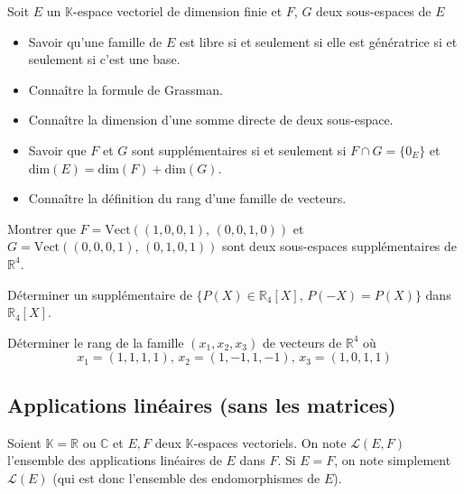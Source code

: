 \documentclass[a4paper,twoside,french,10pt]{VcCours}
\begin{document}
\begin{ptc}{}
	Soit $E$ un $\mathbb{K}$-espace vectoriel de dimension finie et $F$, $G$ deux sous-espaces de $E$
\begin{itemize}
\item Savoir qu'une famille de $E$ est libre si et seulement si elle est génératrice si et seulement si c'est une base.
\item Connaître la formule de Grassman.
\item Connaître la dimension d'une somme directe de deux sous-espace.
\item Savoir que $F$ et $G$ sont supplémentaires si et seulement si $F \cap G = \lbrace 0_E \rbrace$ et $\textrm{dim}(E)= \textrm{dim}(F) + \textrm{dim}(G)$.
\item Connaître la définition du rang d'une famille de vecteurs.
\end{itemize}
\end{ptc}

\medskip

\begin{Exercice}{}\end{Exercice} Montrer que $F=\textrm{Vect}((1,0,0,1), \, (0,0,1,0))$ et $G=\textrm{Vect}((0,0,0,1), \, (0,1,0,1))$ sont deux sous-espaces supplémentaires de $\mathbb{R}^4$.

\medskip

\begin{Exercice}{}\end{Exercice} Déterminer un supplémentaire de $\lbrace P(X) \in \mathbb{R}_4[X], \, P(-X)=P(X)\rbrace$ dans $\mathbb{R}_4[X]$.

\medskip

\begin{Exercice}{}\end{Exercice} Déterminer le rang de la famille $(x_1,x_2,x_3)$ de vecteurs de $\mathbb{R}^4$ où
$$ x_1 = (1,1,1,1), \, x_2 = (1, - 1,1, - 1), \, x_3 = (1,0,1,1)$$
      
      
\medskip

\subsection{Applications linéaires (sans les matrices)}

\medskip

Soient $\mathbb{K}= \mathbb{R}$ ou $\mathbb{C}$ et $E, F$ deux $\mathbb{K}$-espaces vectoriels. On note $\mathcal{L}(E,F)$ l'ensemble des applications linéaires de $E$ dans $F$. Si $E=F$, on note simplement $\mathcal{L}(E)$ (qui est donc l'ensemble des endomorphismes de $E$).
\end{document}
